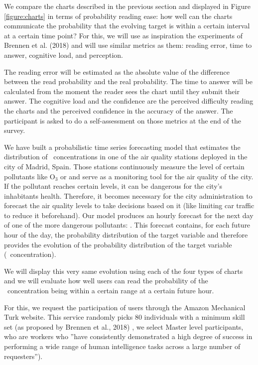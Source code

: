 \documentclass[a4paper,3p,sort&compress]{elsarticle}
\begin{document}
We compare the charts described in the previous section and displayed in Figure
\ref{figure:charts} in terms of probability reading ease: how well can the
charts communicate the probability that the evolving target is within a certain
interval at a certain time point? For this, we will use as inspiration the
experiments of Brennen et al. (2018) \cite{brennen_instrument_2018} and will use
similar metrics as them: reading error, time to answer, cognitive load, and
perception.

The reading error will be estimated as the absolute value of the difference
between the read probability and the real probability. The time to answer will
be calculated from the moment the reader sees the chart until they submit their
answer. The cognitive load and the confidence are the perceived difficulty
reading the charts and the perceived confidence in the accuracy of the answer.
The participant is asked to do a self-assessment on those metrics at the end of
the survey.

We have built a probabilistic time series forecasting model that estimates the
distribution of \no~concentrations in one of the air quality stations deployed
in the city of Madrid, Spain. Those stations continuously measure the level of
certain pollutants like O$_{3}$ or \no and serve as a monitoring tool for the
air quality of the city. If the pollutant reaches certain levels, it can be
dangerous for the city's inhabitants health. Therefore, it becomes necessary for
the city administration to forecast the air quality levels to take decisions
based on it (like limiting car traffic to reduce it beforehand). Our model
produces an hourly forecast for the next day of one of the more dangerous
pollutants: \no. This forecast contains, for each future hour of the day, the
probability distribution of the target variable and therefore provides the
evolution of the probability distribution of the target variable
(\no~concentration).

We will display this very same evolution using each of the four types of charts
and we will evaluate how well users can read the probability of the
\no~concentration being within a certain range at a certain future hour.

For this, we request the participation of users through the Amazon Mechanical
Turk website. This service randomly picks 80 individuals with a minimum skill
set (as proposed by Brennen et al., 2018) \cite{brennen_instrument_2018}, we select
Master level participants, who are workers who ''have consistently demonstrated
a high degree of success in performing a wide range of human intelligence tasks
across a large number of requesters'').
\end{document}
